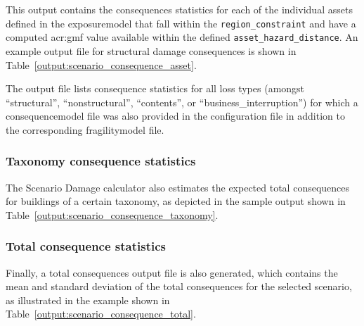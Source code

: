 This output contains the consequences statistics for each of the individual
\glspl{asset} defined in the \gls{exposuremodel} that fall within the
\Verb+region_constraint+ and have a computed \gls{acr:gmf} value available
within the defined \Verb+asset_hazard_distance+. An example output file for
structural damage consequences is shown in
Table~\ref{output:scenario_consequence_asset}.



The output file lists consequence statistics for all loss types (amongst
``structural'', ``nonstructural'', ``contents'', or
``business\_interruption'') for which a \gls{consequencemodel} file was also
provided in the configuration file in addition to the corresponding
\gls{fragilitymodel} file.


\subsubsection{Taxonomy consequence statistics}
\label{subsubsec:scenario_taxonomy_consequence_statistics}

The Scenario Damage calculator also estimates the expected total consequences
for buildings of a certain \gls{taxonomy}, as depicted in the sample output
shown in Table~\ref{output:scenario_consequence_taxonomy}.




\subsubsection{Total consequence statistics}
\label{subsubsec:scenario_total_consequence_statistics}

Finally, a total consequences output file is also generated, which contains
the mean and standard deviation of the total consequences for the selected
scenario, as illustrated in the example shown in
Table~\ref{output:scenario_consequence_total}.


